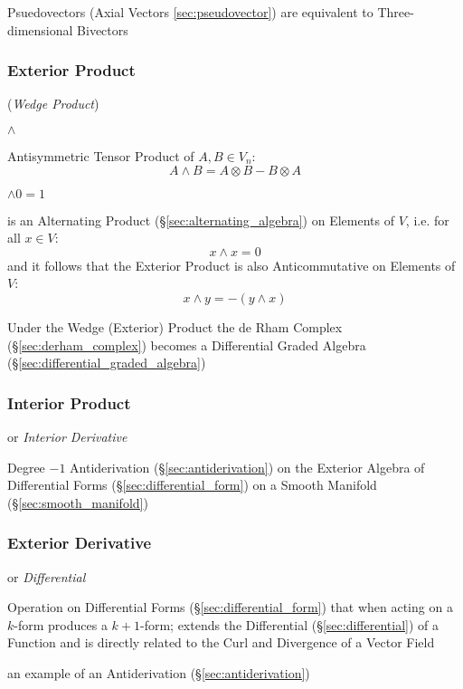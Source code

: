 {{Psuedovectors (Axial Vectors \ref{sec:pseudovector}) are equivalent to
Three-dimensional Bivectors



\subsubsection{Exterior Product}\label{sec:exterior_product}

(\emph{Wedge Product})

$\wedge$

Antisymmetric Tensor Product of $A, B \in V_n$:
\[
  A \wedge B = A \otimes B - B \otimes A
\]

$\wedge 0 = 1$

is an Alternating Product (\S\ref{sec:alternating_algebra}) on Elements of $V$,
i.e. for all $x \in V$:
\[
  x \wedge x = 0
\]
and it follows that the Exterior Product is also Anticommutative on Elements of
$V$:
\[
  x \wedge y = -(y \wedge x)
\]

Under the Wedge (Exterior) Product the de Rham Complex
(\S\ref{sec:derham_complex}) becomes a Differential Graded Algebra
(\S\ref{sec:differential_graded_algebra})



\subsubsection{Interior Product}\label{sec:interior_product}

or \emph{Interior Derivative}

Degree $-1$ Antiderivation (\S\ref{sec:antiderivation}) on the Exterior Algebra
of Differential Forms (\S\ref{sec:differential_form}) on a Smooth Manifold
(\S\ref{sec:smooth_manifold})




\subsubsection{Exterior Derivative}\label{sec:exterior_derivative}\hfill

or \emph{Differential}

Operation on Differential Forms (\S\ref{sec:differential_form}) that when acting
on a $k$-form produces a $k+1$-form; extends the Differential
(\S\ref{sec:differential}) of a Function and is directly related to the Curl and
Divergence of a Vector Field

an example of an Antiderivation (\S\ref{sec:antiderivation})

}}
